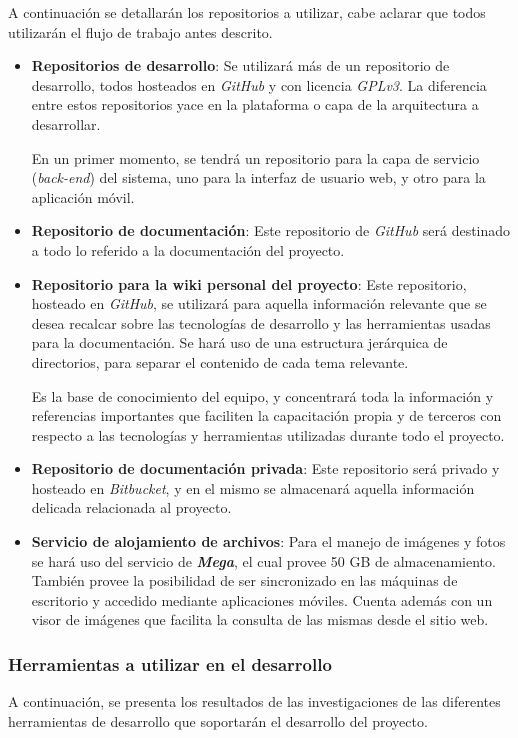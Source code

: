 A continuación se detallarán los repositorios a utilizar, cabe aclarar que todos utilizarán el flujo de trabajo antes descrito.
	\begin{itemize}
	\item \textbf{Repositorios de desarrollo}:
	Se utilizará más de un repositorio de desarrollo, todos hosteados en \textit{GitHub} y con licencia \textit{GPLv3}.
    La diferencia entre estos repositorios yace en la plataforma o capa de la arquitectura a desarrollar.
    
    En un primer momento, se tendrá un repositorio para la capa de servicio (\textit{back-end}) del sistema, uno para la interfaz de usuario web, y otro para la aplicación móvil.

	\item \textbf{Repositorio de documentación}:
    Este repositorio de \textit{GitHub} será destinado a todo lo referido a la documentación del proyecto.

	\item \textbf{Repositorio para la wiki personal del proyecto}:
	Este repositorio, hosteado en \textit{GitHub}, se utilizará para aquella información relevante que se desea recalcar sobre las tecnologías de desarrollo y las herramientas usadas para la documentación.
    Se hará uso de una estructura jerárquica de directorios, para separar el contenido de cada tema relevante.
    
    Es la base de conocimiento del equipo, y concentrará toda la información y referencias importantes que faciliten la capacitación propia y de terceros con respecto a las tecnologías y herramientas utilizadas durante todo el proyecto.

	\item \textbf{Repositorio de documentación privada}:
	Este repositorio será privado y hosteado en \textit{Bitbucket}, y en el mismo se almacenará aquella información delicada relacionada al proyecto.

    \item \textbf{Servicio de alojamiento de archivos}:
    Para el manejo de imágenes y fotos se hará uso del servicio de \textbf{\textit{Mega}}, el cual provee 50 GB de almacenamiento.
    También provee la posibilidad de ser sincronizado en las máquinas de escritorio y accedido mediante aplicaciones móviles.
    Cuenta además con un visor de imágenes que facilita la consulta de las mismas desde el sitio web.
	\end{itemize}


\subsubsection{Herramientas a utilizar en el desarrollo}
A continuación, se presenta los resultados de las investigaciones de las diferentes herramientas de desarrollo que soportarán el desarrollo del proyecto.

